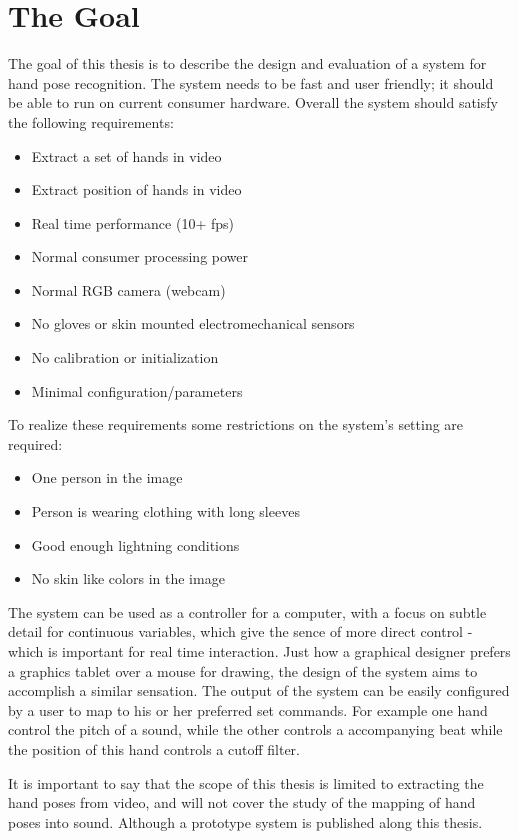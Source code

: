\section{The Goal}
\label{sec:goal}
The goal of this thesis is to describe the design and evaluation of a system for hand pose recognition. The system needs to be fast and user friendly; it should be able to run on current consumer hardware. Overall the system should satisfy the following requirements:

\begin{itemize}
	\item Extract a set of hands in video
	\item Extract position of hands in video
	\item Real time performance (10+ fps)
	\item Normal consumer processing power
	\item Normal RGB camera (webcam)
	\item No gloves or skin mounted electromechanical sensors
	\item No calibration or initialization
	\item Minimal configuration/parameters
\end{itemize}
	
To realize these requirements some restrictions on the system's setting are required:

\begin{itemize}
	\item One person in the image
	\item Person is wearing clothing with long sleeves
	\item Good enough lightning conditions
	\item No skin like colors in the image
\end{itemize}

The system can be used as a controller for a computer, with a focus on subtle detail for continuous variables, which give the sence of more direct control - which is important for real time interaction. Just how a graphical designer prefers a graphics tablet over a mouse for drawing, the design of the system aims to accomplish a similar sensation. The output of the system can be easily configured by a user to map to his or her preferred set commands. For example one hand control the pitch of a sound, while the other controls a accompanying beat while the position of this hand controls a cutoff filter. 

It is important to say that the scope of this thesis is limited to extracting the hand poses from video, and will not cover the study of the mapping of hand poses into sound. Although a prototype system is published along this thesis.



